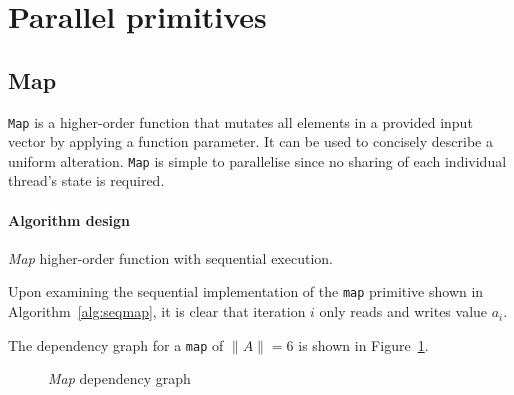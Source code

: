 \section{Parallel primitives}
\subsection{Map}
\verb|Map| is a higher-order function that mutates all elements in a provided input vector by applying a function parameter. It can be used to concisely describe a uniform alteration.
\verb|Map| is simple to parallelise since no sharing of each individual thread's state is required.
\paragraph*{Algorithm design}
\begin{algorithm}
  \caption{\emph{Map} higher-order function with sequential execution.}
  \label{alg:seqmap}

  \begin{algorithmic}
      \EndFor
    \EndFunction
  \end{algorithmic}
\end{algorithm}

Upon examining the sequential implementation of the \verb|map| primitive shown in Algorithm~\ref{alg:seqmap}, it is clear that iteration $i$ only reads and writes value $a_i$.

The dependency graph for a \verb|map| of $\|A\| = 6$ is shown in Figure~\ref{fig:mapgraph}.

\begin{figure}[h]
  \caption{\emph{Map} dependency graph}
  \label{fig:mapgraph}
  \begin{center}
  \end{center}
\end{figure}


